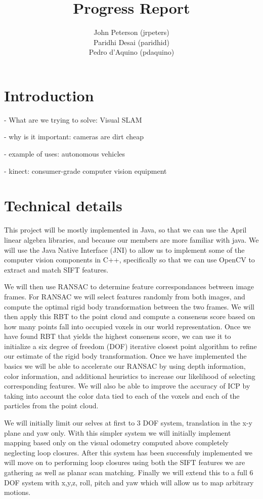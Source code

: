 \documentclass[12pt]{article}
\title{Progress Report}
\author{
	John Peterson (jrpeters)\\
	Paridhi Desai (paridhid)\\
	Pedro d'Aquino (pdaquino)}
\begin{document}
\maketitle

\section{Introduction}
- What are we trying to solve: Visual SLAM

- why is it important: cameras are dirt cheap

- example of uses: autonomous vehicles

- kinect: consumer-grade computer vision equipment

\section{Technical details}
	This project will be mostly implemented in Java, so that we can use the April linear algebra libraries, and because our members are more familiar with java.  We will use the Java Native Interface (JNI) to allow us to implement some of the computer vision components in C++, specifically so that we can use OpenCV to extract and match SIFT features. 

	We will then use RANSAC to determine feature correspondances between image frames.  For RANSAC we will select features randomly from both images, and compute the optimal rigid body transformation between the two frames.  We will then apply this RBT to the point cloud and compute a consensus score based on how many points fall into occupied voxels in our world representation.  Once we have found RBT that yields the highest consensus score, we can use it to initialize a six degree of freedom (DOF) iterative closest point algorithm to refine our estimate of the rigid body transformation.  Once we have implemented the basics we will be able to accelerate our RANSAC by using depth information, color information, and additional heuristics to increase our likelihood of selecting corresponding features.  We will also be able to improve the accuracy of ICP by taking into account the color data tied to each of the voxels and each of the particles from the point cloud. 

	We will initially limit our selves at first to 3 DOF system, translation in the x-y plane and yaw only.  With this simpler system we will initially implement mapping based only on the visual odometry computed above completely neglecting loop closures.  After this system has been successfuly implemented we will move on to performing loop closures using both the SIFT features we are gathering as well as planar scan matching.  Finally we will extend this to a full 6 DOF system with x,y,z, roll, pitch and yaw which will allow us to map arbitrary motions.  
\end{document}
